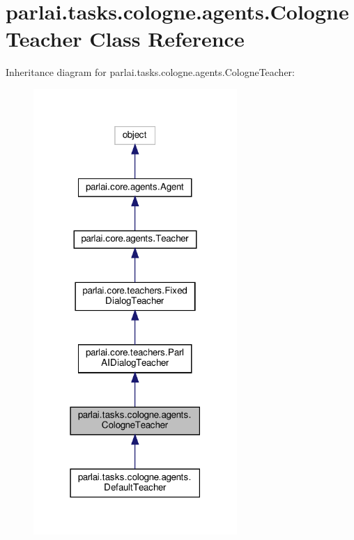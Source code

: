 \hypertarget{classparlai_1_1tasks_1_1cologne_1_1agents_1_1CologneTeacher}{}\section{parlai.\+tasks.\+cologne.\+agents.\+Cologne\+Teacher Class Reference}
\label{classparlai_1_1tasks_1_1cologne_1_1agents_1_1CologneTeacher}


Inheritance diagram for parlai.\+tasks.\+cologne.\+agents.\+Cologne\+Teacher\+:
\nopagebreak
\begin{figure}[H]
\begin{center}
\leavevmode
\includegraphics[width=219pt]{dd/d09/classparlai_1_1tasks_1_1cologne_1_1agents_1_1CologneTeacher__inherit__graph}
\end{center}
\end{figure}



